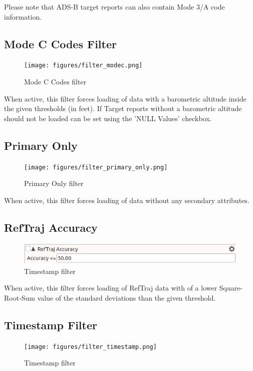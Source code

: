 Please note that ADS-B target reports can also contain Mode 3/A code information.

\subsection{Mode C Codes Filter}

\begin{figure}[H]
  \center
    \texttt{[image: figures/filter\_modec.png]}
  \caption{Mode C Codes filter}
\end{figure}

When active, this filter forces loading of data with a barometric altitude inside the given thresholds (in feet). If Target reports without a barometric altitude should not be loaded can be set using the 'NULL Values' checkbox.

\subsection{Primary Only}

\begin{figure}[H]
  \center
    \texttt{[image: figures/filter\_primary\_only.png]}
  \caption{Primary Only filter}
\end{figure}

When active, this filter forces loading of data without any secondary attributes.

\subsection{RefTraj Accuracy}

\begin{figure}[H]
  \center
    \includegraphics[width=12cm,frame]{figures/filter_reftrajacc.png}
  \caption{Timestamp filter}
\end{figure}

When active, this filter forces loading of RefTraj data with of a lower Square-Root-Sum value of the standard deviations than the given threshold.


\subsection{Timestamp Filter}

\begin{figure}[H]
  \center
    \texttt{[image: figures/filter\_timestamp.png]}
  \caption{Timestamp filter}
\end{figure}

